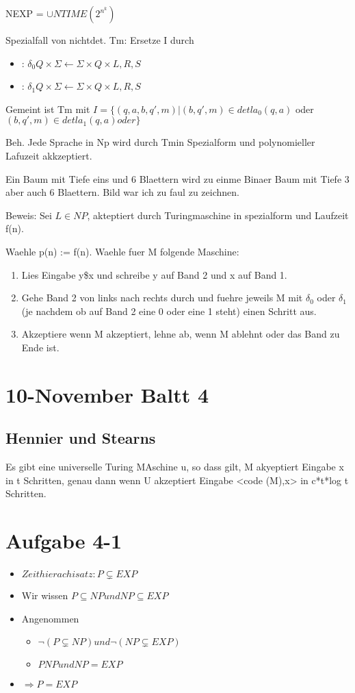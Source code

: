 \documentclass[12pt, oneside, a4paper, numbers=enddot, abstracton, parskip=full]{scrreprt}
\begin{document}
NEXP = $\cup NTIME(2^{n^{k}})$

Spezialfall von nichtdet. Tm:
Ersetze I durch
\begin{itemize}
\item : $ \delta_0 Q \times \Sigma \leftarrow \Sigma \times Q \times
{L,R,S} $
\item : $ \delta_1 Q \times \Sigma \leftarrow \Sigma \times Q \times
{L,R,S} $

\end{itemize}

Gemeint ist Tm mit
$I = \{(q,a,b,q',m) | (b,q',m) \in detla_0 (q,a) $ oder
  $(b,q',m) \in detla_1 (q,a) oder\}$

Beh. Jede Sprache in Np wird durch Tmin Spezialform und polynomieller
Lafuzeit akkzeptiert.

Ein Baum mit Tiefe eins und 6 Blaettern wird zu einme Binaer Baum mit
Tiefe 3  aber auch 6 Blaettern. Bild war ich zu faul zu zeichnen.


Beweis: Sei $ L\in NP$, akteptiert durch Turingmaschine in spezialform und
Laufzeit f(n).

Waehle p(n) := f(n).
Waehle fuer M folgende Maschine:
\begin{enumerate}
\item Lies Eingabe y\$x und schreibe y
auf Band 2 und x auf Band 1.
\item Gehe Band 2 von links nach rechts durch und fuehre jeweils M mit
  $\delta_0$ oder $\delta_1$ (je nachdem ob auf Band 2 eine 0 oder
  eine 1 steht) einen Schritt aus.
\item Akzeptiere wenn M akzeptiert, lehne ab, wenn M ablehnt oder das
  Band zu Ende ist.
\end{enumerate}


\section{10-November Baltt 4}
\subsection{Hennier und Stearns}
Es gibt eine universelle Turing MAschine u, so dass gilt, M akyeptiert
Eingabe x  in t Schritten, genau dann wenn U akzeptiert Eingabe <code
(M),x> in c*t*log t Schritten.

\section{Aufgabe 4-1}
\begin{itemize}
\item $ Zeithierachisatz: P \subsetneq EXP $
\item Wir wissen $P \subseteq NP und NP \subseteq EXP $
\item Angenommen
\begin{itemize}
\item $\neg (P\subsetneq NP) und \neg (NP \subsetneq EXP)$
\item $PNP und NP = EXP $
\end{itemize}
\item $\Rightarrow P = EXP$
\end{itemize}
\end{document}
